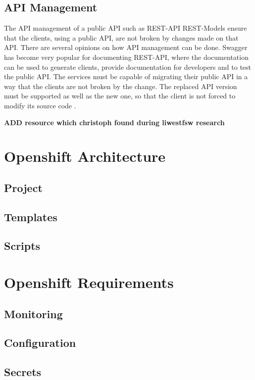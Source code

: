 \subsection{API Management}
\label{sec:esboc-requirements-service-api}
The API management of a public API such as REST-API REST-Models ensure that the clients, using a public API, are not broken by changes made on that API. There are several opinions on how API management can be done. Swagger has become very popular for documenting REST-API, where the documentation can be used to generate clients, provide documentation for developers and to test the public API. The services must be capable of migrating their public API in a way that the clients are not broken by the change. The replaced API version must be supported as well as the new one, so that the client is not forced to modify its source code \cite{SmartBearSwagger2018}.

\textbf{ADD resource which christoph found during liwestfsw research} 

\section{Openshift Architecture}
\label{sec:esboc-design-oc}

\subsection{Project}
\label{sec:esboc-design-oc-}

\subsection{Templates}
\label{sec:esboc-design-oc-config}

\subsection{Scripts}
\label{sec:esboc-design-oc-secrets}

\section{Openshift Requirements}
\label{sec:esboc-requirements-oc}

\subsection{Monitoring}
\label{sec:esboc-requirements-oc-monitoring}

\subsection{Configuration}
\label{sec:esboc-requirements-oc-config}

\subsection{Secrets}
\label{sec:esboc-requirements-oc-secrets}